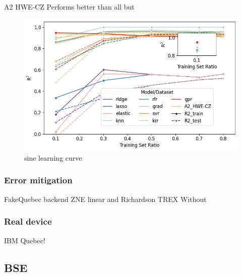 \documentclass[journal=jacsat,manuscript=article]{achemso}
\begin{document}
A2 HWE-CZ
Performs better than all but 
\begin{figure}[H]
	\centering
	\includegraphics[width=\textwidth]{images/Function_Fitting/sine_learning_curves.png}
	\caption{sine learning curve}
	\label{fig:sine_learning_curves}
\end{figure}


\subsubsection{Error mitigation}
FakeQuebec backend
ZNE linear and Richardson
TREX
Without

\subsubsection{Real device}
IBM Quebec!

\subsection{BSE} 
\end{document}
